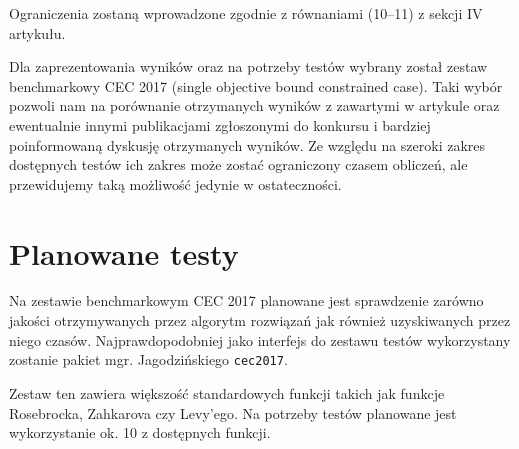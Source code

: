 Ograniczenia zostaną wprowadzone zgodnie z równaniami (10--11) z sekcji IV artykułu.


Dla zaprezentowania wyników oraz na potrzeby testów wybrany został zestaw benchmarkowy CEC 2017 (single objective bound constrained case). Taki wybór pozwoli nam na porównanie otrzymanych wyników z zawartymi w artykule oraz ewentualnie innymi publikacjami zgłoszonymi do konkursu i bardziej poinformowaną dyskusję otrzymanych wyników. Ze względu na szeroki zakres dostępnych testów ich zakres może zostać ograniczony czasem obliczeń, ale przewidujemy taką możliwość jedynie w ostateczności.

\section{Planowane testy}
Na zestawie benchmarkowym CEC 2017 planowane jest sprawdzenie zarówno jakości otrzymywanych przez algorytm rozwiązań jak również uzyskiwanych przez niego czasów. Najprawdopodobniej jako interfejs do zestawu testów wykorzystany zostanie pakiet mgr. Jagodzińskiego \verb+cec2017+.

Zestaw ten zawiera większość standardowych funkcji takich jak funkcje Rosebrocka, Zahkarova czy Levy'ego. Na potrzeby testów planowane jest wykorzystanie ok. 10 z dostępnych funkcji.

